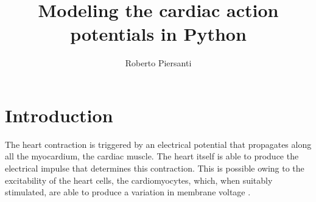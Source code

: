 \documentclass[11pt,a4paper]{article}
\begin{document}
\setcounter{page}{1}

\title{Modeling the cardiac action potentials in Python} 

\author[a]{Roberto Piersanti}


\maketitle 





\section{Introduction}\label{sec:intro}
The heart contraction is triggered by an electrical potential that propagates along all the myocardium, the cardiac muscle. The heart itself is able to produce the electrical impulse that determines this contraction. This
is possible owing to the excitability of the heart cells, the cardiomyocytes,
which, when suitably stimulated, are able to produce a variation in membrane voltage \cite{quarteroni2019}.
\end{document}
